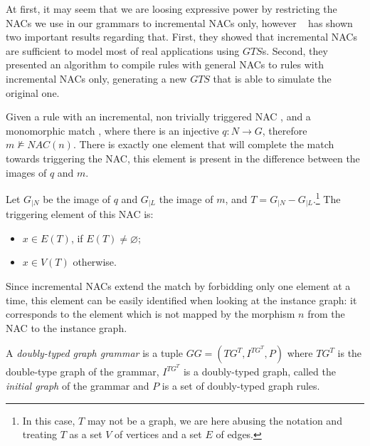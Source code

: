 At first, it may seem that we are loosing expressive power by restricting the NACs we use in our grammars to incremental NACs only, however ~\cite{Corradini2013} has shown two important results regarding that. First, they showed that incremental NACs are sufficient to model most of real applications using $GTS$s. Second, they presented an algorithm to compile rules with general NACs to rules with incremental NACs only, generating a new $GTS$ that is able to simulate the original one.

\begin{definition} Given a rule \graphrule{} with an incremental, non trivially triggered NAC \nac{}, and a monomorphic match \match{}, where there is an injective $q : N \rightarrow G$, therefore $m \not\models NAC(n)$. There is exactly one element that will complete the match towards triggering the NAC, this element is present in the difference between the images of $q$ and $m$.

  Let $G_{|N}$ be the image of $q$ and $G_{|L}$ the image of $m$, and \mbox{$T = G_{|N} - G_{|L}$}.\footnote{In this case, $T$ may not be a graph, we are here abusing the notation and treating $T$ as a set $V$ of vertices and a set $E$ of edges.} The triggering element of this NAC is:

  \begin{itemize}
    \item $x \in E(T)$, if $E(T) \neq \varnothing$;
    \item $x \in V(T)$ otherwise.
  \end{itemize} 
\end{definition}

\begin{example}
Since incremental NACs extend the match by forbidding only one element at a time, this element can be easily identified when looking at the instance graph: it corresponds to the element which is not mapped by the morphism $n$ from the NAC to the instance graph.
\end{example}

\begin{definition} A \emph{doubly-typed graph grammar} is a tuple $GG = \left(TG^T, I^{TG^T},P \right)$ where $TG^T$ is the double-type graph of the grammar, $I^{TG^T}$ is a doubly-typed graph, called the \emph{initial graph} of the grammar and $P$ is a set of doubly-typed graph rules.
\end{definition}


